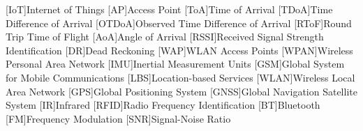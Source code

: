 \begin{acronym}[OTDoA]
	[IoT]{Internet of Things}
	[AP]{Access Point}
	[ToA]{Time of Arrival}
	[TDoA]{Time Difference of Arrival}
	[OTDoA]{Observed Time Difference of Arrival}
	[RToF]{Round Trip Time of Flight}
	[AoA]{Angle of Arrival}
	[RSSI]{Received Signal Strength Identification}
	[DR]{Dead Reckoning}
	[WAP]{WLAN Access Points}
	[WPAN]{Wireless Personal Area Network}
	[IMU]{Inertial Measurement Units}
	[GSM]{Global System for Mobile Communications}
	[LBS]{Location-based Services}
	[WLAN]{Wireless Local Area Network}
	[GPS]{{Global Positioning System}}
	[GNSS]{Global Navigation Satellite System}
	[IR]{Infrared}
	[RFID]{Radio	Frequency Identification}
	[BT]{Bluetooth}
	[FM]{Frequency Modulation}
	[SNR]{Signal-Noise Ratio}
\end{acronym}